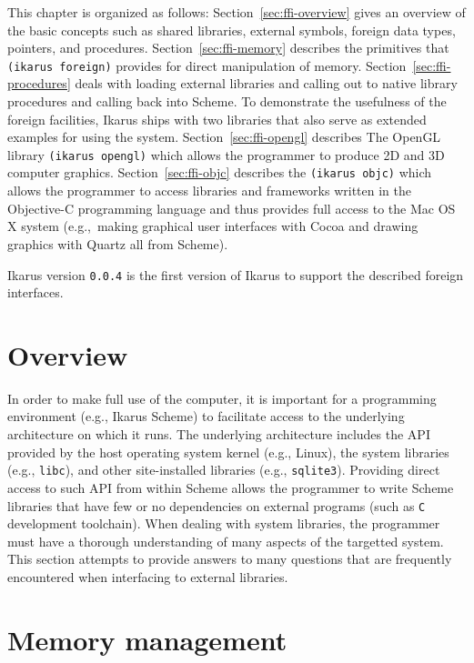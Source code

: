 \documentclass[onecolumn, 12pt, twoside, openright, dvipdfm]{book}
\begin{document}
This chapter is organized as follows: Section~\ref{sec:ffi-overview}
gives an overview of the basic concepts such as shared libraries,
external symbols, foreign data types, pointers, and procedures.
Section~\ref{sec:ffi-memory} describes the primitives that
\texttt{(ikarus~foreign)} provides for direct manipulation of
memory.  Section~\ref{sec:ffi-procedures} deals with loading
external libraries and calling out to native library procedures and
calling back into Scheme.  To demonstrate the usefulness of the
foreign facilities, Ikarus ships with two libraries that also serve
as extended examples for using the system.
Section~\ref{sec:ffi-opengl} describes The OpenGL library
\texttt{(ikarus~opengl)} which allows the programmer to produce 2D
and 3D computer graphics.  Section~\ref{sec:ffi-objc} describes the
\texttt{(ikarus~objc)} which allows the programmer to access
libraries and frameworks written in the Objective-C programming
language and thus provides full access to the Mac OS X system
(e.g.,~making graphical user interfaces with Cocoa and drawing
graphics with Quartz all from Scheme).

Ikarus version \texttt{0.0.4} is the first version of Ikarus to
support the described foreign interfaces.
\newpage

\section{\label{sec:ffi-overview}Overview}

In order to make full use of the computer, it is important for a
programming environment (e.g., Ikarus Scheme) to facilitate access
to the underlying architecture on which it runs.  The underlying
architecture includes the API provided by the host operating system
kernel (e.g., Linux), the system libraries (e.g., \texttt{libc}),
and other site-installed libraries (e.g., \texttt{sqlite3}).
Providing direct access to such API from within Scheme allows the
programmer to write Scheme libraries that have few or no
dependencies on external programs (such as \texttt{C} development
toolchain).  When dealing with system libraries, the programmer
must have a thorough understanding of many aspects of the targetted 
system.  This section attempts to provide answers to many questions
that are frequently encountered when interfacing to external
libraries.


\section{Memory management}
\end{document}
